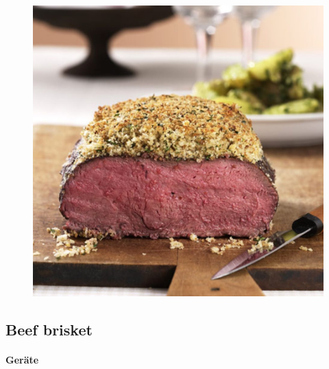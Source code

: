\begin{figure}[htbp]
	\centering
	\begin{minipage}{1\textwidth}
		\centering
		\includegraphics[width=1\linewidth]{pics/roastbeefmitkraeuterkruste}
		\label{fig:Roastbeef}
	\end{minipage}
\end{figure}
\newpage


\subsection{Beef brisket}

\paragraph{Geräte}

